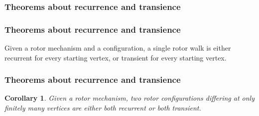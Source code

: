 \documentclass{beamer}
\newtheorem{cor}[theorem]{Corollary}
\begin{document}

\begin{frame}
	\frametitle{Theorems about recurrence and transience}
	
\end{frame}


\begin{frame}
	\frametitle{Theorems about recurrence and transience}
	
	\begin{theorem}
		Given a rotor mechanism and a configuration, a single rotor walk is either recurrent for every starting vertex, or transient for every starting vertex.
	\end{theorem}
	

\pause
	\frametitle{Theorems about recurrence and transience}
	
	\begin{cor}
		Given a rotor mechanism, two rotor configurations differing at only finitely many vertices are either both recurrent or both transient.
	\end{cor}
	
\end{frame}

\end{document}
